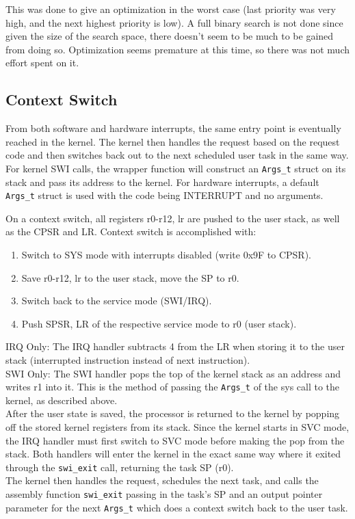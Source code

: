 \documentclass[12pt]{article}
\begin{document}
This was done to give an optimization in the worst case (last priority was very high, and the next highest priority is low). A full binary search is not done since given the size of the search space, there doesn't seem to be much to be gained from doing so. Optimization seems premature at this time, so there was not much effort spent on it.

\subsection{Context Switch}
From both software and hardware interrupts, the same entry point is eventually reached in the kernel. The kernel then handles the request based on the request code and then switches back out to the next scheduled user task in the same way. For kernel SWI calls, the wrapper function will construct an \texttt{Args\_t} struct on its stack and pass its address to the kernel. For hardware interrupts, a default \texttt{Args\_t} struct is used with the code being INTERRUPT and no arguments.

On a context switch, all registers {r0-r12, lr} are pushed to the user stack, as well as the CPSR and LR. Context switch is accomplished with:

\begin{enumerate}
    \item Switch to SYS mode with interrupts disabled (write 0x9F to CPSR).
    \item Save {r0-r12, lr} to the user stack, move the SP to r0.
    \item Switch back to the service mode (SWI/IRQ).
    \item Push SPSR, LR of the respective service mode to r0 (user stack).
\end{enumerate}

IRQ Only: The IRQ handler subtracts 4 from the LR when storing it to the user stack (interrupted instruction instead of next instruction).
\\
SWI Only: The SWI handler pops the top of the kernel stack as an address and writes r1 into it. This is the method of passing the \texttt{Args\_t} of the sys call to the kernel, as described above.
\\
After the user state is saved, the processor is returned to the kernel by popping off the stored kernel registers from its stack. Since the kernel starts in SVC mode, the IRQ handler must first switch to SVC mode before making the pop from the stack. Both handlers will enter the kernel in the exact same way where it exited through the \texttt{swi\_exit} call, returning the task SP (r0).
\\
The kernel then handles the request, schedules the next task, and calls the assembly function \texttt{swi\_exit} passing in the task's SP and an output pointer parameter for the next \texttt{Args\_t} which does a context switch back to the user task.
\end{document}
